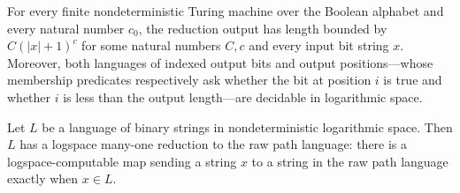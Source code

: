 \begin{theorem}
\label{Complexity.PathHard.implicitlyLogspaceComputable_red}
\leanok
{}
For every finite nondeterministic Turing machine over the Boolean alphabet and every
natural number $c_0$, the reduction output has length bounded by $C(|x|+1)^c$ for some
natural numbers $C,c$ and every input bit string $x$. Moreover, both languages of
indexed output bits and output positions—whose membership predicates respectively ask
whether the bit at position $i$ is true and whether $i$ is less than the output
length—are decidable in logarithmic space.
\end{theorem}

\begin{theorem}
\label{Complexity.pathRawLang_NLHard}
\leanok
{}
Let $L$ be a language of binary strings in nondeterministic logarithmic space. Then $L$
has a logspace many-one reduction to the raw path language: there is a
logspace-computable map sending a string $x$ to a string in the raw path language
exactly when $x\in L$.
\end{theorem}
